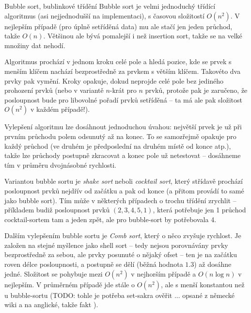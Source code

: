 \begin{algoritmusN}{Bubble sort, bublinkové třídění}
Bubble sort je velmi jednoduchý třídící algoritmus (asi nejjednodušší na implementaci), s časovou složitostí $O(n^2)$. V nejlepším případě (pro úplně setříděná data) mu ale stačí jen jeden průchod, takže $O(n)$. Většinou ale bývá pomalejší i než insertion sort, takže se na velké množiny dat nehodí.

Algoritmus prochází v jednom kroku celé pole a hledá pozice, kde se prvek s menším klíčem nachází bezprostředně za prvkem s větším klíčem. Takovéto dva prvky pak vymění. Kroky opakuje, dokud neprojde celé pole bez jediného prohození prvků (nebo v  variantě $n$-krát pro $n$ prvků, protože pak je zaručeno, že posloupnost bude pro libovolné pořadí prvků setříděná -- ta má ale pak složitost $O(n^2)$ v každém případě!).

Vylepšení algoritmu lze dosáhnout jednoduchou úvahou: největší prvek je už při prvním průchodu polem odsunutý až na konec. To se samozřejmě opakuje pro každý průchod (ve druhém je předposlední na druhém místě od konce atp.), takže lze průchody postupně zkracovat a konec pole už netestovat -- dosáhneme tím v průměru dvojnásobné rychlosti.

Variantou bubble sortu je \emph{shake sort} neboli \emph{cocktail sort}, který střídavě prochází posloupnost prvků nejdřív od začátku a pak od konce (a přitom provádí to samé jako bubble sort). Tím může v některých případech o trochu třídění zrychlit -- příkladem budiž posloupnost prvků $(2,3,4,5,1)$, která potřebuje jen 1 průchod cocktail-sortem tam a jeden zpět, ale pro bubble-sort by potřebovala 4.

Dalším vylepšením bubble sortu je \emph{Comb sort}, který o něco zvyšuje rychlost. Je založen na stejné myšlence jako shell sort -- tedy nejsou porovnávány prvky bezprostředně za sebou, ale prvky posunuté o nějaký ofset -- ten je na začátku roven délce posloupnosti, a postupně se dělí  (běžná hodnota $1.3$) až dosáhne jedné. Složitost se pohybuje mezi $O(n^2)$ v nejhorším případě a $O(n\log n)$ v nejlepším. V průměrném případě jde stále o $O(n^2)$, ale s menší konstantou než u bubble-sortu (TODO: tohle je potřeba set-sakra ověřit ... opsané z německé wiki a  na anglické, takže fakt ).
\end{algoritmusN}

